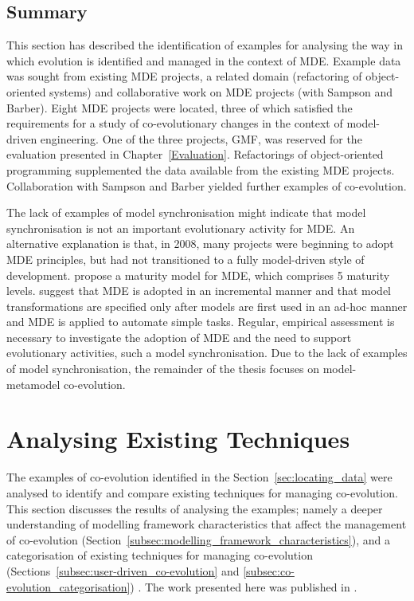 \subsection{Summary}
This section has described the identification of examples for analysing the way in which evolution is identified and managed in the context of MDE. Example data was sought from existing MDE projects, a related domain (refactoring of object-oriented systems) and collaborative work on MDE projects (with Sampson and Barber). Eight MDE projects were located, three of which satisfied the requirements for a study of co-evolutionary changes in the context of model-driven engineering. One of the three projects, GMF, was reserved for the evaluation presented in Chapter~\ref{Evaluation}. Refactorings of object-oriented programming supplemented the data available from the existing MDE projects. Collaboration with Sampson and Barber yielded further examples of co-evolution.

The lack of examples of model synchronisation might indicate that model synchronisation is not an important evolutionary activity for MDE. An alternative explanation is that, in 2008, many projects were beginning to adopt MDE principles, but had not transitioned to a fully model-driven style of development. \cite{rios06mdd_maturity} propose a maturity model for MDE, which comprises 5 maturity levels. \cite{rios06mdd_maturity} suggest that MDE is adopted in an incremental manner and that model transformations are specified only after models are first used in an ad-hoc manner and MDE is applied to automate simple tasks. Regular, empirical assessment is necessary to investigate the adoption of MDE and the need to support evolutionary activities, such a model synchronisation. Due to the lack of examples of model synchronisation, the remainder of the thesis focuses on model-metamodel co-evolution.

\section{Analysing Existing Techniques}
\label{sec:analysing_existing_techniques}
The examples of co-evolution identified in the Section~\ref{sec:locating_data} were analysed to identify and compare existing techniques for managing co-evolution. This section discusses the results of analysing the examples; namely a deeper understanding of modelling framework characteristics that affect the management of co-evolution (Section~\ref{subsec:modelling_framework_characteristics}), and a categorisation of existing techniques for managing co-evolution (Sections~\ref{subsec:user-driven_co-evolution} and \ref{subsec:co-evolution_categorisation}) . The work presented here was published in \cite{rose09analysis,rose09enhanced}.


